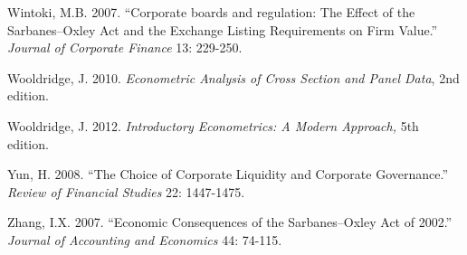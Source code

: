 \noindent Wintoki, M.B. 2007. ``Corporate boards and regulation: The Effect of the Sarbanes--Oxley Act and the Exchange Listing Requirements on Firm Value.''  \textit{Journal of Corporate Finance} 13: 229-250. 

\noindent Wooldridge, J. 2010. \textit{Econometric Analysis of Cross Section and Panel Data}, 2nd edition.

\noindent Wooldridge, J. 2012. \textit{Introductory Econometrics:  A Modern Approach, }5th edition.

\noindent Yun, H. 2008. ``The Choice of Corporate Liquidity and Corporate Governance.'' \textit{ Review of Financial Studies} 22: 1447-1475.

\noindent Zhang, I.X. 2007. ``Economic Consequences of the Sarbanes--Oxley Act of 2002.'' \textit{Journal of Accounting and Economics} 44: 74-115.
